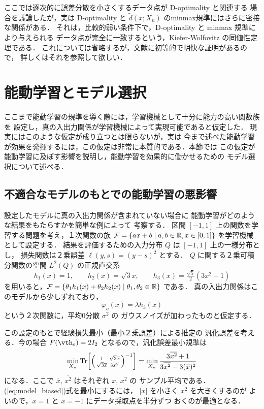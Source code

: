 \documentclass[master]{cimt}
\newcommand{\R}{{\mathbb{R}}}
\newcommand{\trace}{\text{Tr}}
\begin{document}
ここでは逐次的に誤差分散を小さくするデータ点が D-optimality と関連する
場合を議論したが，実は D-optimality と
$\tilde{d}(x; X_n)$ のminmax規準にはさらに密接な関係がある．
それは，比較的弱い条件下で，D-optimality と minmax 規準により与えられる
データ点が完全に一致するという，Kiefer-Wolfovitz の同値性定理である．
これについては省略するが，文献\cite{KW_equiv}に初等的で明快な証明があるので，
詳しくはそれを参照して欲しい．


\section{能動学習とモデル選択}
\label{sec:model_selec}
ここまで能動学習の規準を導く際には，学習機械として十分に能力の高い関数族を
設定し，真の入出力関係が学習機械によって実現可能であると仮定した．
現実にはこのような仮定が成り立つとは限らないが，実は
今まで述べた能動学習
が効果を発揮するには，この仮定は非常に本質的である．本節では
この仮定が能動学習に及ぼす影響を説明し，能動学習を効果的に働かせるための
モデル選択について述べる．

\subsection{不適合なモデルのもとでの能動学習の悪影響}
\label{sec:mismatch}
設定したモデルに真の入出力関係が含まれていない場合に
能動学習がどのような結果をもたらすかを簡単な例によって
考察する．
区間 $[-1,1]$ 上の関数を学習する問題を考え，１次関数の族 ${\cal F} = \{ 
a x + b \mid a,b \in \R, x \in [0,1] \}$ を学習機械として設定する．
結果を評価するための入力分布 $Q$ は $[-1,1]$ 上の一様分布とし，
損失関数は２乗誤差 $\ell(y,s) = (y-s)^2$ とする．
$Q$ に関する２乗可積分関数の空間 $L^2(Q)$ の正規直交系
\begin{equation*}
	h_1(x) = 1, \qquad h_2(x) = \sqrt{3}x, \qquad 
	h_3(x) = \tfrac{\sqrt{5}}{2}(3x^2 - 1)
\end{equation*}
を用いると，${\cal F} = \{ \theta_1 h_1(x) + \theta_2 h_2(x) \mid 
\theta_1, \theta_2 \in \R \}$ である．
真の入出力関係はこのモデルから少しずれており，
\[
	\varphi_o(x) = \lambda h_3(x) 
\]
という２次関数に，平均0分散 $\sigma^2$ の
ガウスノイズが加わったものと仮定する．

この設定のもとで経験損失最小（最小２乗誤差）による推定の
汎化誤差を考える．今の場合
$F(\vth_o) = 2 I_2$ となるので，汎化誤差最小規準は
\begin{equation}
	\min_{X_n} \trace \biggl[ \Bigl( \begin{smallmatrix}
		1 & \sqrt{3}\overline{x} \\
		\sqrt{3}\overline{x} & 3\overline{x^2}  \end{smallmatrix} \Bigr)^{-1} 
		\biggr] = 
	\min_{X_n} 
	\frac{3\overline{x^2}+1}{3\overline{x^2} - 3 (\overline{x})^2}
\label{eq:model_biased}
\end{equation}
になる．ここで $\overline{x}$, $\overline{x^2}$ はそれぞれ $x$, $x^2$ の
サンプル平均である．(\ref{eq:model_biased})式を最小にするには，
$|\overline{x}|$ を小さく $\overline{x^2}$ を大きくするのが
よいので，$x = 1$ と $x = -1$ にデータ採取点を半分ずつ
おくのが最適となる．
\end{document}
